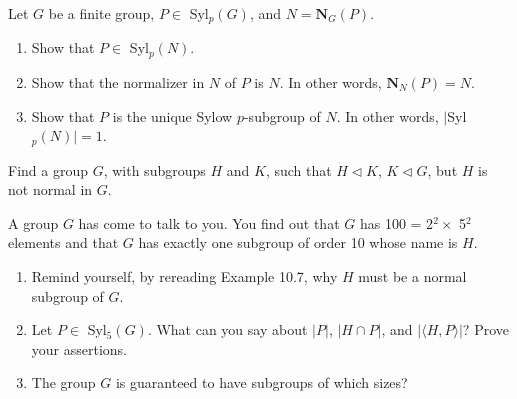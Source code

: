 \documentclass[12pt,letterpaper,boxed]{hmcpset}
\begin{document}

\begin{problem}[7.3.5]
Let $G$ be a finite group, $ P \in $ Syl$_p(G)$, and $N = \textbf{N}_G(P)$.
\begin{enumerate}[label=\alph*]
\item Show that $P \in$ Syl$_p(N)$.
\item Show that the normalizer in $N$ of $P$ is $N$. In other words, $\textbf{N}_N(P) = N $. 
\item Show that $P$ is the unique Sylow $p$-subgroup of $N$. In other words, $\vert$Syl$_p(N) \vert = 1$.
\end{enumerate}
\end{problem}

\begin{solution}
\end{solution}

\clearpage

\begin{problem}[10.1.9]
Find a group $G$, with subgroups $H$ and $K$, such that $ H \triangleleft K $, $ K \triangleleft G $, but $H$ is not normal in $G$. 
\end{problem}

\begin{solution}
\end{solution}

\clearpage


\begin{problem}[10.1.13]
A group $G$ has come to talk to you. You find out that $G$ has 100 = 2$^2 \times $ 5$^2$ elements and that $G$ has exactly one subgroup of order 10 whose name is $H$. 
\begin{enumerate}[label=\alph*]
\item Remind yourself, by rereading Example 10.7, why $H$ must be a normal subgroup of $G$. 
\item Let $P \in$ Syl$_5(G)$. What can you say about $ \vert P \vert $, $ \vert H \cap P \vert $, and $ \vert \langle H, P \rangle \vert $? Prove your assertions. 
\item The group $G$ is guaranteed to have subgroups of which sizes?
\end{enumerate}
\end{problem}

\begin{solution}
\end{solution}

\clearpage
\end{document}
